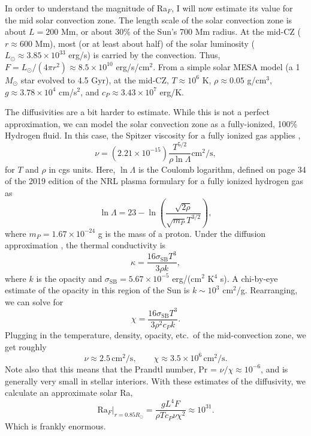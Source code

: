 In order to understand the magnitude of Ra$_F$, I will now estimate its value for the mid solar convection zone.
The length scale of the solar convection zone is about $L = 200$ Mm, or about 30\% of the Sun's 700 Mm radius.
At the mid-CZ ($r \approx 600$ Mm), most (or at least about half) of the solar luminosity ($L_\odot \approx 3.85 \times 10^{33}$ erg/s) is carried by the convection.
Thus, $F = L_{\odot} / (4\pi r^2) \approx 8.5 \times 10^{10}$ erg/s/cm$^2$.
From a simple solar MESA model (a 1 $M_\odot$ star evolved to 4.5 Gyr), at the mid-CZ, $T \approx 10^6$ K, $\rho \approx 0.05$ g/cm$^3$, $g \approx 3.78 \times 10^4$ cm/s$^2$, and $c_P \approx 3.43 \times 10^{7}$ erg/K.

The diffusivities are a bit harder to estimate.
While this is not a perfect approximation, we can model the solar convection zone as a fully-ionized, 100\% Hydrogen fluid.
In this case, the Spitzer viscosity for a fully ionized gas applies \citep[Eqn.~5-54 of][]{spitzer1962},
\begin{equation}
\nu = (2.21 \times 10^{-15}) \frac{T^{5/2}}{\rho \ln \Lambda} \text{cm}^2/\text{s},
\end{equation}
for $T$ and $\rho$ in cgs units.
Here, $\ln\Lambda$ is the Coulomb logarithm, defined on page 34 of the 2019 edition of the NRL plasma formulary for a fully ionized hydrogen gas as
\begin{equation}
\ln \Lambda = 23 - \ln\left(\frac{\sqrt{2\rho}}{\sqrt{m_P}T^{3/2}}\right),
\end{equation}
where $m_P = 1.67 \times 10^{-24}$ g is the mass of a proton.
Under the diffusion approximation \citep[e.g., ch.~14.A-6 of][]{weiss&all2004}, the thermal conductivity is 
\begin{equation}
\kappa = \frac{16 \sigma_{\text{SB}} T^3}{3\rho k},
\end{equation}
where $k$ is the opacity and $\sigma_{\text{SB}} = 5.67 \times 10^{-5}$ erg/(cm$^2$ K$^4$ s).
A chi-by-eye estimate of the opacity in this region of the Sun \citep[from OPAL opacities and Fig.~3 of][]{paxton&all2011} is $k \sim 10^3$ cm$^2$/g.
Rearranging, we can solve for
$$
\chi = \frac{16 \sigma_{\text{SB}} T^3}{3\rho^2 c_P k}.
$$
Plugging in the temperature, density, opacity, etc.~of the mid-convection zone, we get roughly
\begin{equation}
\nu \approx 2.5 \,\text{cm}^2/\text{s}, \qquad
\chi \approx 3.5 \times 10^{6}\,\text{cm}^2/\text{s}.
\end{equation}
Note also that this means that the Prandtl number, Pr = $\nu/\chi \approx  10^{-6}$, and is generally very small in stellar interiors.
With these estimates of the diffusivity, we calculate an approximate solar Ra,
\begin{equation}
\text{Ra}_F\bigg|_{r=0.85 R_\odot} = \frac{g L^4 F}{\rho T c_P \nu \chi^2} \approx 10^{31}.
\end{equation}
Which is frankly enormous.

